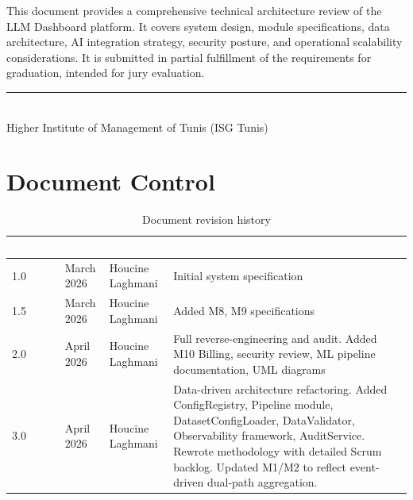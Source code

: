 \documentclass[12pt,a4paper,twoside]{report}
\begin{document}
\begin{titlepage}
\begin{center}
\vspace{1.0cm}

{\small\color{gray}
This document provides a comprehensive technical architecture review of the
LLM Dashboard platform. It covers system design, module specifications,
data architecture, AI integration strategy, security posture, and
operational scalability considerations. It is submitted in partial fulfillment 
of the requirements for graduation, intended for jury evaluation.}

\vfill

\rule{\linewidth}{0.4pt}\\[0.2cm]
{\small Higher Institute of Management of Tunis (ISG Tunis)}

\end{center}
\end{titlepage}


\chapter*{Document Control}

\begin{table}[H]
\centering
\begin{tabularx}{\textwidth}{|l|l|l|X|}
\hline
\rowcolor{tabheader}
\textcolor{white}{\textbf{Version}} &
\textcolor{white}{\textbf{Date}} &
\textcolor{white}{\textbf{Author}} &
\textcolor{white}{\textbf{Changes}} \\
\hline
1.0 & March 2026 & Houcine Laghmani & Initial system specification \\
\hline
1.5 & March 2026 & Houcine Laghmani & Added M8, M9 specifications \\
\hline
2.0 & April 2026 & Houcine Laghmani & Full reverse-engineering and audit. Added M10 Billing, security review, ML pipeline documentation, UML diagrams \\
\hline
3.0 & April 2026 & Houcine Laghmani & Data-driven architecture refactoring. Added ConfigRegistry, Pipeline module, DatasetConfigLoader, DataValidator, Observability framework, AuditService. Rewrote methodology with detailed Scrum backlog. Updated M1/M2 to reflect event-driven dual-path aggregation. \\
\hline
\end{tabularx}
\caption{Document revision history}
\end{table}
\end{document}
